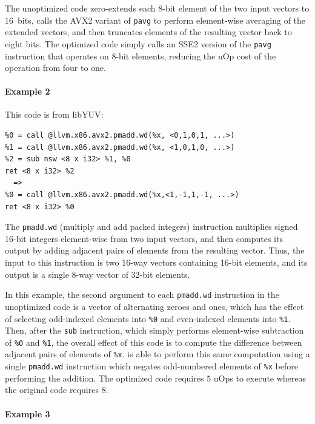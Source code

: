 The unoptimized code zero-extends each 8-bit element of the two input
vectors to 16~bits, calls the AVX2 variant of \texttt{pavg} to perform
element-wise averaging of the extended vectors, and then truncates
elements of the resulting vector back to eight bits.
%
The optimized code simply calls an SSE2 version of the \texttt{pavg}
instruction that operates on 8-bit elements, reducing the uOp cost
of the operation from four to one.


\paragraph*{Example 2}

This code is from libYUV:

{\begin{quoting}\begin{Verbatim}
%0 = call @llvm.x86.avx2.pmadd.wd(%x, <0,1,0,1, ...>)
%1 = call @llvm.x86.avx2.pmadd.wd(%x, <1,0,1,0, ...>)
%2 = sub nsw <8 x i32> %1, %0
ret <8 x i32> %2
  =>
%0 = call @llvm.x86.avx2.pmadd.wd(%x,<1,-1,1,-1, ...>)
ret <8 x i32> %0
\end{Verbatim}
\end{quoting}}

The \texttt{pmadd.wd} (multiply and add packed integers) instruction multiplies
signed 16-bit integers element-wise from two input vectors, and then
computes its output by adding adjacent pairs of elements from the
resulting vector.
%
Thus, the input to this instruction is two 16-way vectors containing
16-bit elements, and its output is a single 8-way vector of 32-bit
elements.


In this example, the second argument to each \texttt{pmadd.wd}
instruction in the unoptimized code is a vector of alternating zeroes
and ones, which has the effect of selecting odd-indexed elements into
\texttt{\%0} and even-indexed elements into \texttt{\%1}.
%
Then, after the \texttt{sub} instruction, which simply performs
element-wise subtraction of \texttt{\%0} and \texttt{\%1}, the overall
effect of this code is to compute the difference between adjacent
pairs of elements of \texttt{\%x}.
%
\minotaur{} is able to perform this same computation using a single
\texttt{pmadd.wd} instruction which negates odd-numbered elements of
\texttt{\%x} before performing the addition.
%
The optimized code requires $5$ uOps to execute whereas the original
code requires $8$.


\paragraph*{Example 3}

